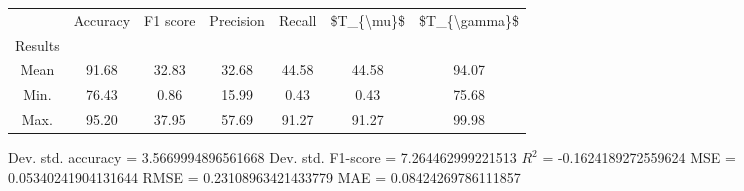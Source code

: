 \begin{tabular}{|c|c|c|c|c|c|c|}
\toprule
{} &  Accuracy &  F1 score &  Precision &  Recall &  \$T\_\{\textbackslash mu\}\$ &  \$T\_\{\textbackslash gamma\}\$ \\
Results &           &           &            &         &            &               \\
\hline
Mean    &     91.68 &     32.83 &      32.68 &   44.58 &      44.58 &         94.07 \\
Min.    &     76.43 &      0.86 &      15.99 &    0.43 &       0.43 &         75.68 \\
Max.    &     95.20 &     37.95 &      57.69 &   91.27 &      91.27 &         99.98 \\
\bottomrule
\end{tabular}

 Dev. std. accuracy = 3.5669994896561668
 Dev. std. F1-score = 7.264462999221513
 $R^2$ = -0.1624189272559624
 MSE = 0.05340241904131644
 RMSE = 0.23108963421433779
 MAE = 0.08424269786111857
